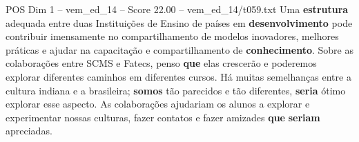\begin{textsample}{POS Dim 1 – vem\_ed\_14 – Score 22.00 – vem\_ed\_14/t059.txt}
Uma \textbf{estrutura} adequada entre duas Instituições de Ensino de países em \textbf{desenvolvimento} pode contribuir imensamente no compartilhamento de modelos inovadores, melhores práticas e ajudar na capacitação e compartilhamento de \textbf{conhecimento}.
Sobre as colaborações entre SCMS e Fatecs, penso \textbf{que} elas crescerão e poderemos explorar diferentes caminhos em diferentes cursos.
Há muitas semelhanças entre a cultura indiana e a brasileira; \textbf{somos} tão parecidos e tão diferentes, \textbf{seria} ótimo explorar esse aspecto.
As colaborações ajudariam os alunos a explorar e experimentar nossas culturas, fazer contatos e fazer amizades \textbf{que} \textbf{seriam} apreciadas.

\end{textsample}
